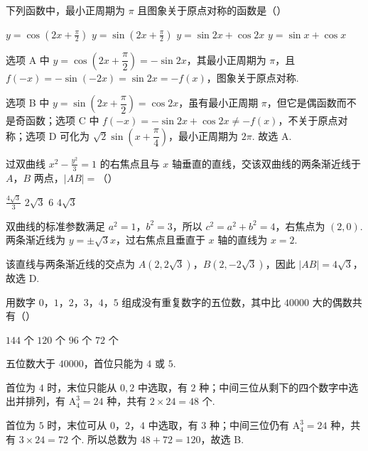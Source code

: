 \begin{problem}
下列函数中，最小正周期为 \(\pi\) 且图象关于原点对称的函数是（\quad）

\choices
    {\( y = \cos \left(2x + \frac{\pi}{2}\right) \)}
    {\( y = \sin \left(2x + \frac{\pi}{2}\right) \)}
    {\( y = \sin 2x + \cos 2x \)}
    {\( y = \sin x + \cos x \)}


\begin{solution}
选项 A 中 \(y=\cos\left(2x+\dfrac\pi2\right)=-\sin 2x\)，其最小正周期为 \(\pi\)，且 \(f(-x)=-\sin(-2x)=\sin 2x=-f(x)\)，图象关于原点对称.

选项 B 中 \(y=\sin\left(2x+\dfrac\pi2\right)=\cos2x\)，虽有最小正周期 \(\pi\)，但它是偶函数而不是奇函数；选项 C 中 \(f(-x)=-\sin2x+\cos2x\ne-f(x)\)，不关于原点对称；选项 D 可化为 \(\sqrt2\sin\left(x+\dfrac\pi4\right)\)，最小正周期为 \(2\pi\). 故选 A.
\end{solution}
\end{problem}

\begin{problem}
过双曲线 \(x^{2} - \frac{y^{2}}{3} = 1\) 的右焦点且与 \(x\) 轴垂直的直线，交该双曲线的两条渐近线于 \(A\)，\(B\) 两点，\(|AB| =\)（\quad）

\choices
    {\(\frac{4\sqrt{3}}{3}\)}
    {\(2 \sqrt{3}\)}
    {6}
    {\(4 \sqrt{3}\)}


\begin{solution}
双曲线的标准参数满足 \(a^{2}=1\)，\(b^{2}=3\)，所以 \(c^{2}=a^{2}+b^{2}=4\)，右焦点为 \((2,0)\). 两条渐近线为 \(y=\pm\sqrt3x\)，过右焦点且垂直于 \(x\) 轴的直线为 \(x=2\).

该直线与两条渐近线的交点为 \(A(2,2\sqrt3)\)，\(B(2,-2\sqrt3)\)，因此 \(\lvert AB\rvert=4\sqrt3\)，故选 D.
\end{solution}
\end{problem}

\begin{problem}
用数字 \(0\)，\(1\)，\(2\)，\(3\)，\(4\)，\(5\) 组成没有重复数字的五位数，其中比 \(40000\) 大的偶数共有（\quad）

\choices
    {\(144\text{ 个}\)}
    {\(120\text{ 个}\)}
    {\(96\text{ 个}\)}
    {\(72\text{ 个}\)}


\begin{solution}
五位数大于 \(40000\)，首位只能为 \(4\) 或 \(5\).

首位为 \(4\) 时，末位只能从 \(0,2\) 中选取，有 \(2\) 种；中间三位从剩下的四个数字中选出并排列，有 \(\mathrm A_4^3=24\) 种，共有 \(2\times24=48\) 个.

首位为 \(5\) 时，末位可从 \(0\)，\(2\)，\(4\) 中选取，有 \(3\) 种；中间三位仍有 \(\mathrm A_4^3=24\) 种，共有 \(3\times24=72\) 个. 所以总数为 \(48+72=120\)，故选 B.
\end{solution}
\end{problem}

